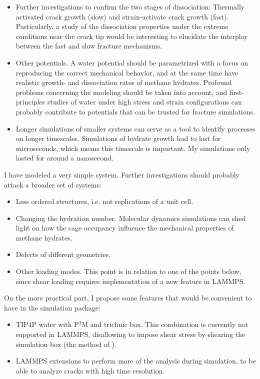 \begin{itemize}
\item Further investigations to confirm the two stages of dissociation: Thermally activated crack growth (slow) and strain-activate crack growth (fast). Particularly, a study of the dissociation properties under the extreme conditions near the crack tip would be interesting to elucidate the interplay between the fast and slow fracture mechanisms.
\item Other potentials. A water potential should be parametrized with a focus on reproducing the correct mechanical behavior, and at the same time have realistic growth- and dissociation rates of methane hydrates. Profound problems concerning the modeling should be taken into account, and first-principles studies of water under high stress and strain configurations can probably contribute to potentials that can be trusted for fracture simulations. 
\item Longer simulations of smaller systems can serve as a tool to identify processes on longer timescales. Simulations of hydrate growth had to last for microseconds, which means this timescale is important. My simulations only lasted for around a nanosecond.
\end{itemize}

I have modeled a very simple system. Further investigations should probably attack a broader set of systems:

\begin{itemize}
\item Less ordered structures, i.e. not replications of a unit cell.
\item Changing the hydration number. Molecular dynamics simulations can shed light on how the cage occupancy influence the mechanical properties of methane hydrates.
\item Defects of different geometries.
\item Other loading modes. This point is in relation to one of the points below, since shear loading requires implementation of a new feature in LAMMPS.
\end{itemize}
%

On the more practical part, I propose some features that would be convenient to have in the simulation package:
\begin{itemize}
\item TIP4P water with P$^3$M and triclinic box. This combination is currently not supported in LAMMPS, disallowing to impose shear stress by shearing the simulation box (the method of \citet{Parrinello1981}).
\item LAMMPS extensions to perform more of the analysis during simulation, to be able to analyze cracks with high time resolution.
\end{itemize}
 
